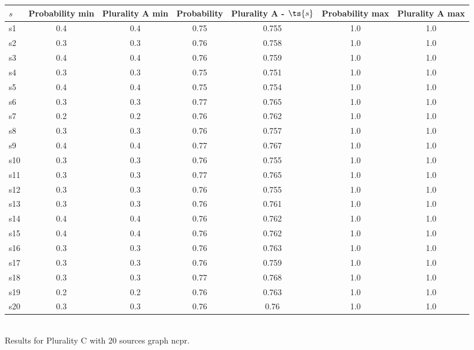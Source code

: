 \documentclass{article}
\begin{document}
\noindent\begin{tabular}{|l|c|c|c|c|c|c|}
\hline
$s$& Probability min & Plurality A min & Probability & Plurality A - $\ts{s}$ & Probability max & Plurality A max\\
\hline
s1 &0.4 & 0.4 & 0.75 & 0.755 & 1.0 & 1.0\\
\hline
s2 &0.3 & 0.3 & 0.76 & 0.758 & 1.0 & 1.0\\
\hline
s3 &0.4 & 0.4 & 0.76 & 0.759 & 1.0 & 1.0\\
\hline
s4 &0.3 & 0.3 & 0.75 & 0.751 & 1.0 & 1.0\\
\hline
s5 &0.4 & 0.4 & 0.75 & 0.754 & 1.0 & 1.0\\
\hline
s6 &0.3 & 0.3 & 0.77 & 0.765 & 1.0 & 1.0\\
\hline
s7 &0.2 & 0.2 & 0.76 & 0.762 & 1.0 & 1.0\\
\hline
s8 &0.3 & 0.3 & 0.76 & 0.757 & 1.0 & 1.0\\
\hline
s9 &0.4 & 0.4 & 0.77 & 0.767 & 1.0 & 1.0\\
\hline
s10 &0.3 & 0.3 & 0.76 & 0.755 & 1.0 & 1.0\\
\hline
s11 &0.3 & 0.3 & 0.77 & 0.765 & 1.0 & 1.0\\
\hline
s12 &0.3 & 0.3 & 0.76 & 0.755 & 1.0 & 1.0\\
\hline
s13 &0.3 & 0.3 & 0.76 & 0.761 & 1.0 & 1.0\\
\hline
s14 &0.4 & 0.4 & 0.76 & 0.762 & 1.0 & 1.0\\
\hline
s15 &0.4 & 0.4 & 0.76 & 0.762 & 1.0 & 1.0\\
\hline
s16 &0.3 & 0.3 & 0.76 & 0.763 & 1.0 & 1.0\\
\hline
s17 &0.3 & 0.3 & 0.76 & 0.759 & 1.0 & 1.0\\
\hline
s18 &0.3 & 0.3 & 0.77 & 0.768 & 1.0 & 1.0\\
\hline
s19 &0.2 & 0.2 & 0.76 & 0.763 & 1.0 & 1.0\\
\hline
s20 &0.3 & 0.3 & 0.76 & 0.76 & 1.0 & 1.0\\
\hline
\end{tabular}\\

\noindent Results for Plurality C with 20 sources graph ncpr.
\end{document}
